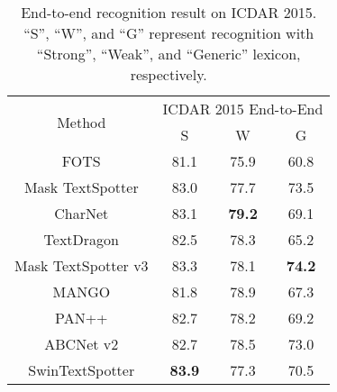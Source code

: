 \documentclass[10pt,twocolumn,letterpaper]{article}
\begin{document}
\begin{table}[t]
\begin{tabular}{c|ccc}
\hline
\multirow{2}{*}{Method} & \multicolumn{3}{c}{ICDAR 2015 End-to-End}                    \\ \cline{2-4} 
                        & \multicolumn{1}{c|}{S}    & \multicolumn{1}{c|}{W}    & G    \\ \hline
FOTS\cite{liu2018fots}                    & \multicolumn{1}{c|}{81.1} & \multicolumn{1}{c|}{75.9} & 60.8 \\
Mask TextSpotter\cite{liao2019mask}        & \multicolumn{1}{c|}{83.0} & \multicolumn{1}{c|}{77.7} & 73.5 \\
CharNet\cite{xing2019convolutional}                 & \multicolumn{1}{c|}{83.1} & \multicolumn{1}{c|}{\textbf{79.2}} & 69.1 \\
TextDragon\cite{feng2019textdragon}              & \multicolumn{1}{c|}{82.5} & \multicolumn{1}{c|}{78.3} & 65.2 \\
Mask TextSpotter v3\cite{liao2020mask}     & \multicolumn{1}{c|}{83.3} & \multicolumn{1}{c|}{78.1} & \textbf{74.2} \\
MANGO\cite{qiao2021mango}                   & \multicolumn{1}{c|}{81.8} & \multicolumn{1}{c|}{78.9} & 67.3 \\
PAN++\cite{wang2021pan++}                   & \multicolumn{1}{c|}{82.7} & \multicolumn{1}{c|}{78.2} & 69.2 \\
ABCNet v2\cite{liu2021abcnetv2}                & \multicolumn{1}{c|}{82.7} & \multicolumn{1}{c|}{78.5} & 73.0 \\ \hline
SwinTextSpotter         & \multicolumn{1}{c|}{\textbf{83.9}} & \multicolumn{1}{c|}{77.3} & 70.5 \\ \hline
\end{tabular}
\caption{End-to-end recognition result on ICDAR 2015. “S”, “W”, and “G” represent recognition with “Strong”, “Weak”, and “Generic” lexicon, respectively.}
\label{ICDAR 2015 End-to-End recognition result}
\end{table}
\end{document}
